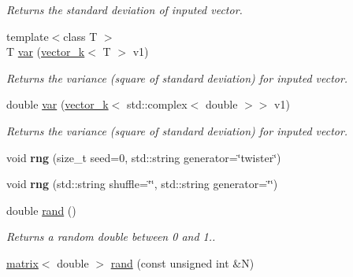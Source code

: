 \begin{DoxyCompactItemize}
\begin{DoxyCompactList}\small\item\em Returns the standard deviation of inputed vector. \end{DoxyCompactList}\item 
\hypertarget{namespacekeycpp_a553528cf7a020895037ce3b1a828a04c}{{\footnotesize template$<$class T $>$ }\\T \hyperlink{namespacekeycpp_a553528cf7a020895037ce3b1a828a04c}{var} (\hyperlink{classkeycpp_1_1vector__k}{vector\-\_\-k}$<$ T $>$ v1)}\label{namespacekeycpp_a553528cf7a020895037ce3b1a828a04c}

\begin{DoxyCompactList}\small\item\em Returns the variance (square of standard deviation) for inputed vector. \end{DoxyCompactList}\item 
\hypertarget{namespacekeycpp_af3249effde70a573fbd8881dc4629e04}{double \hyperlink{namespacekeycpp_af3249effde70a573fbd8881dc4629e04}{var} (\hyperlink{classkeycpp_1_1vector__k}{vector\-\_\-k}$<$ std\-::complex$<$ double $>$$>$ v1)}\label{namespacekeycpp_af3249effde70a573fbd8881dc4629e04}

\begin{DoxyCompactList}\small\item\em Returns the variance (square of standard deviation) for inputed vector. \end{DoxyCompactList}\item 
\hypertarget{namespacekeycpp_a93e133b94bc27c9b984d0383b01772d4}{void {\bfseries rng} (size\-\_\-t seed=0, std\-::string generator=\char`\"{}twister\char`\"{})}\label{namespacekeycpp_a93e133b94bc27c9b984d0383b01772d4}

\item 
\hypertarget{namespacekeycpp_af2478c69f713d8664b53d31f25718530}{void {\bfseries rng} (std\-::string shuffle=\char`\"{}\char`\"{}, std\-::string generator=\char`\"{}\char`\"{})}\label{namespacekeycpp_af2478c69f713d8664b53d31f25718530}

\item 
\hypertarget{namespacekeycpp_a5ef5c1f5951e8182a7c4ec9612f3f7e1}{double \hyperlink{namespacekeycpp_a5ef5c1f5951e8182a7c4ec9612f3f7e1}{rand} ()}\label{namespacekeycpp_a5ef5c1f5951e8182a7c4ec9612f3f7e1}

\begin{DoxyCompactList}\small\item\em Returns a random double between 0 and 1.. \end{DoxyCompactList}\item 
\hypertarget{namespacekeycpp_ab99a9561cf5654ae722a0879b41d9d73}{\hyperlink{classkeycpp_1_1matrix}{matrix}$<$ double $>$ \hyperlink{namespacekeycpp_ab99a9561cf5654ae722a0879b41d9d73}{rand} (const unsigned int \&N)}\label{namespacekeycpp_ab99a9561cf5654ae722a0879b41d9d73}


\end{DoxyCompactItemize}
